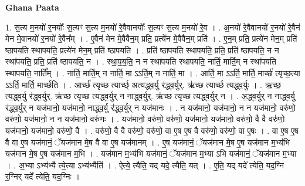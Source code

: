 \documentclass[17pt]{extarticle}
\begin{document}
\textbf{Ghana Paata } \newline

1. स॒त्य म॒नयो॑ र॒नयोः᳚ स॒त्यꣳ स॒त्य म॒नयो॑ रे॒वैवानयोः᳚ स॒त्यꣳ स॒त्य म॒नयो॑ रे॒व । . अ॒नयो॑ रे॒वैवानयो॑ र॒नयो॑ रे॒वैन॑ मेन मे॒वानयो॑ र॒नयो॑ रे॒वैन᳚म् । . ए॒वैन॑ मेन मे॒वैवैन॒म् प्रति॒ प्रत्ये॑न मे॒वैवैन॒म् प्रति॑ । . ए॒न॒म् प्रति॒ प्रत्ये॑न मेन॒म् प्रति॑ ष्ठापयति स्थापयति॒ प्रत्ये॑न मेन॒म् प्रति॑ ष्ठापयति । . प्रति॑ ष्ठापयति स्थापयति॒ प्रति॒ प्रति॑ ष्ठापयति॒ न न स्था॑पयति॒ प्रति॒ प्रति॑ ष्ठापयति॒ न । . स्था॒प॒य॒ति॒ न न स्था॑पयति स्थापयति॒ नार्ति॒ मार्ति॒म् न स्था॑पयति स्थापयति॒ नार्ति᳚म् । . नार्ति॒ मार्ति॒म् न नार्ति॒ मा ऽऽर्ति॒म् न नार्ति॒ मा । . आर्ति॒ मा ऽऽर्ति॒ मार्ति॒ मार्च्छ॑ त्यृच्छ॒त्या ऽऽर्ति॒ मार्ति॒ मार्च्छ॑ति । . आर्च्छ॑ त्यृच्छ त्यार्च्छ् अत्यद्ध्व॒र्यु र॑द्ध्व॒र्युर्. ऋ॑च्छ त्यार्च्छ त्यद्ध्व॒र्युः । . ऋ॒च्छ॒ त्य॒द्ध्व॒र्यु र॑द्ध्व॒र्युर्. ऋ॑च्छ त्यृच्छ त्यद्ध्व॒र्युर् न नाद्ध्व॒र्युर्. ऋ॑च्छ त्यृच्छ त्यद्ध्व॒र्युर् न । . अ॒द्ध्व॒र्युर् न नाद्ध्व॒र्यु र॑द्ध्व॒र्युर् न यज॑मानो॒ यज॑मानो॒ नाद्ध्व॒र्यु र॑द्ध्व॒र्युर् न यज॑मानः । . न यज॑मानो॒ यज॑मानो॒ न न यज॑मानो॒ वरु॑णो॒ वरु॑णो॒ यज॑मानो॒ न न यज॑मानो॒ वरु॑णः । . यज॑मानो॒ वरु॑णो॒ वरु॑णो॒ यज॑मानो॒ यज॑मानो॒ वरु॑णो॒ वै वै वरु॑णो॒ यज॑मानो॒ यज॑मानो॒ वरु॑णो॒ वै । . वरु॑णो॒ वै वै वरु॑णो॒ वरु॑णो॒ वा ए॒ष ए॒ष वै वरु॑णो॒ वरु॑णो॒ वा ए॒षः । . वा ए॒ष ए॒ष वै वा ए॒ष यज॑मानं॒ ॅयज॑मान मे॒ष वै वा ए॒ष यज॑मानम् । . ए॒ष यज॑मानं॒ ॅयज॑मान मे॒ष ए॒ष यज॑मान म॒भ्य॑भि यज॑मान मे॒ष ए॒ष यज॑मान म॒भि । . यज॑मान म॒भ्य॑भि यज॑मानं॒ ॅयज॑मान म॒भ्या ऽभि यज॑मानं॒ ॅयज॑मान म॒भ्या । . अ॒भ्या ऽभ्य॑भ्यै त्ये॒त्या ऽभ्य॑भ्यैति॑ । . ऐत्ये॒ त्यैति॒ यद् यदे॒ त्यैति॒ यत् । . ए॒ति॒ यद् यदे᳚ त्येति॒ यद॒ग्नि र॒ग्निर् यदे᳚ त्येति॒ यद॒ग्निः । \newline
\end{document}

